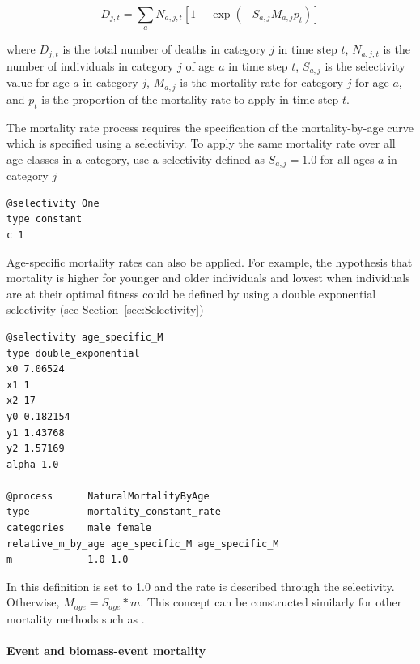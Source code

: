 \begin{equation}
D_{j,t} = \sum_a N_{a,j,t} [1 - \exp(-S_{a,j} M_{a,j} p_t)]
\end{equation}

where $D_{j,t}$ is the total number of deaths in category $j$ in time step $t$, $N_{a,j,t}$ is the number of individuals in category $j$ of age $a$ in time step $t$, $S_{a,j}$ is the selectivity value for age $a$ in category $j$, $M_{a,j}$ is the mortality rate for category $j$ for age $a$, and $p_t$ is the proportion of the mortality rate to apply in time step $t$.

The mortality rate process requires the specification of the mortality-by-age curve which is specified using a selectivity. To apply the same mortality rate over all age classes in a category, use a selectivity defined as $S_{a,j}=1.0$ for all ages $a$ in category $j$

{\small{\begin{verbatim}
@selectivity One
type constant
c 1
\end{verbatim}}}

Age-specific mortality rates can also be applied. For example, the hypothesis that mortality is higher for younger and older individuals and lowest when individuals are at their optimal fitness could be defined by using a double exponential selectivity (see Section~\ref{sec:Selectivity})

{\small{\begin{verbatim}
@selectivity age_specific_M
type double_exponential
x0 7.06524
x1 1
x2 17
y0 0.182154
y1 1.43768
y2 1.57169
alpha 1.0

@process      NaturalMortalityByAge
type          mortality_constant_rate
categories    male female
relative_m_by_age age_specific_M age_specific_M
m             1.0 1.0
\end{verbatim}}}


In this definition  is set to 1.0 and the rate is described through the selectivity. Otherwise, $M_{age} = S_{age} * m$. This concept can be constructed similarly for other mortality methods such as .

\paragraph{Event and biomass-event mortality}\label{sec:Process-MortalityEvent}\label{sec:Process-MortalityEventBiomass} 

